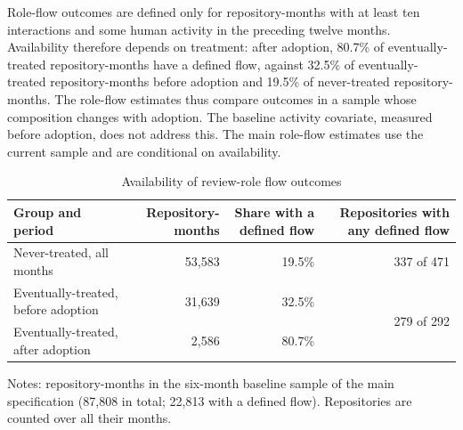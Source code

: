 \begin{paragraph}
Role-flow outcomes are defined only for repository-months with at least ten interactions and some human activity in the preceding twelve months. Availability therefore depends on treatment: after adoption, 80.7\% of eventually-treated repository-months have a defined flow, against 32.5\% of eventually-treated repository-months before adoption and 19.5\% of never-treated repository-months. The role-flow estimates thus compare outcomes in a sample whose composition changes with adoption. The baseline activity covariate, measured before adoption, does not address this. The main role-flow estimates use the current sample and are conditional on availability.
\end{paragraph}

\begin{table}[htbp]
\centering
\caption{Availability of review-role flow outcomes}\label{tab:role_flow_availability}
\begin{tabular}{lrrr}
\toprule
Group and period & Repository-months & Share with a defined flow & Repositories with any defined flow \\
\midrule
Never-treated, all months & 53{,}583 & 19.5\% & 337 of 471 \\
Eventually-treated, before adoption & 31{,}639 & 32.5\% & \multirow{2}{*}{279 of 292} \\
Eventually-treated, after adoption & 2{,}586 & 80.7\% & \\
\bottomrule
\end{tabular}
\par\smallskip
\footnotesize Notes: repository-months in the six-month baseline sample of the main specification (87{,}808 in total; 22{,}813 with a defined flow). Repositories are counted over all their months.
\end{table}
